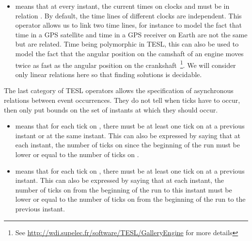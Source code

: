 \begin{isabellebody}
\begin{isamarkuptext}
\begin{itemize}
\item {} means that at every instant, the current times on clocks 
and  must be in relation . By default, the time lines of different clocks are 
independent. This operator allows us to link two time lines, for instance to model the fact
that time in a GPS satellite and time in a GPS receiver on Earth are not the same but are 
related. Time being polymorphic in TESL, this can also be used to model the fact that the
angular position on the camshaft of an engine moves twice as fast as the angular position 
on the crankshaft~\footnote{See \url{http://wdi.supelec.fr/software/TESL/GalleryEngine} for more details}. 
We will consider only linear relations here so that finding solutions is decidable.%
\end{itemize}%
\end{isamarkuptext}\isamarkuptrue%
%
\isadelimdocument
%
\endisadelimdocument
%
\isatagdocument
%
\isamarkuptrue%
%
\endisatagdocument
{\isafolddocument}%
%
\isadelimdocument
%
\endisadelimdocument
%
\begin{isamarkuptext}%
The last category of TESL operators allows the specification of asynchronous relations between
event occurrences. They do not tell when ticks have to occur, then only put bounds on the set 
of instants at which they should occur.

%
\begin{itemize}%
\item {} means that for each tick on , there must be at least one tick
on  at a previous instant or at the same instant. This can also be expressed by saying
that at each instant, the number of ticks on  since the beginning of the run must be lower 
or equal to the number of ticks on .

\item {} means that for each tick on , there must be at least one tick
on  at a previous instant. This can also be expressed by saying that at each instant, 
the number of ticks on  from the beginning of the run to this instant must be lower or 
equal to the number of ticks on  from the beginning of the run to the previous instant.%
\end{itemize}%
\end{isamarkuptext}\isamarkuptrue%
%
\isadelimtheory
%
\endisadelimtheory
%
\isatagtheory
%
\endisatagtheory
{\isafoldtheory}%
%
\isadelimtheory
%
\endisadelimtheory
%
\end{isabellebody}%
